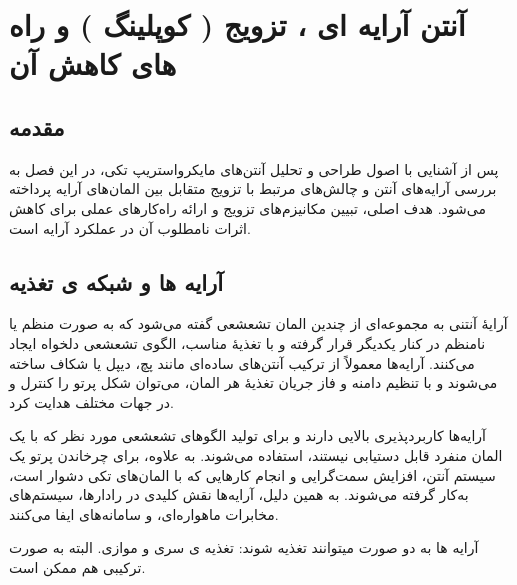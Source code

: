 \newpage 
\chapter{آنتن آرایه ای ، تزویج ( کوپلینگ ) و راه های کاهش آن}
\label{ch:2}
\section{مقدمه}
پس از آشنایی با اصول طراحی و تحلیل آنتن‌های مایکرواستریپ تکی، در این فصل به بررسی آرایه‌های آنتن و چالش‌های مرتبط با تزویج متقابل
 بین المان‌های آرایه پرداخته می‌شود. هدف اصلی، تبیین مکانیزم‌های تزویج و ارائه راه‌کارهای عملی برای کاهش اثرات نامطلوب آن در عملکرد آرایه است.
 
\section{آرایه ها و شبکه ی تغذیه}
آرایهٔ آنتنی به مجموعه‌ای از چندین المان تشعشعی گفته می‌شود که به صورت منظم یا نامنظم در کنار یکدیگر قرار گرفته و با تغذیهٔ مناسب، الگوی تشعشعی دلخواه ایجاد می‌کنند. آرایه‌ها معمولاً از ترکیب آنتن‌های ساده‌ای مانند پچ، دیپل یا شکاف ساخته می‌شوند و با تنظیم دامنه و فاز جریان تغذیهٔ هر المان، می‌توان شکل پرتو را کنترل و در جهات مختلف هدایت کرد.


آرایه‌ها کاربردپذیری بالایی دارند و برای تولید الگوهای تشعشعی مورد نظر که با یک المان منفرد قابل دستیابی نیستند، استفاده می‌شوند. به علاوه، برای چرخاندن پرتو یک سیستم آنتن، افزایش سمت‌گرایی
 و انجام کارهایی که با المان‌های تکی دشوار است، به‌کار گرفته می‌شوند. به همین دلیل، آرایه‌ها نقش کلیدی در رادارها، سیستم‌های مخابرات ماهواره‌ای،
  و سامانه‌های
   ایفا می‌کنند.
   
   
   آرایه ها به دو صورت میتوانند تغذیه شوند:‌ تغذیه ی سری و موازی. البته به صورت ترکیبی هم ممکن است.
   


